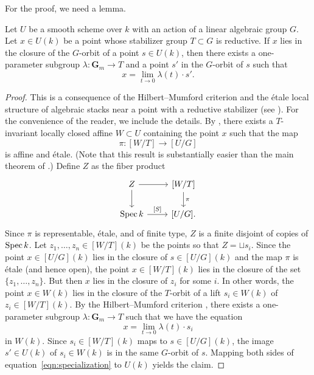 \documentclass[12pt,reqno]{amsart}
\renewcommand{\k}{k}
\renewcommand{\to}{{\longrightarrow}}
\numberwithin{equation}{section}
\newcommand{\G}{\mathbf G}
\begin{document}
For the proof, we need a lemma.
\begin{lemma}\label{prop:oneparam}
  Let \(U\) be a smooth scheme over $\k$ with an action of a linear algebraic group $G$.
  Let $x \in U(\k)$ be a point whose stabilizer group $T \subset G$ is reductive.
  If $x$ lies in the closure of the $G$-orbit of a point $s \in U(\k)$, then there exists a one-parameter subgroup $\lambda \colon \G_m \to T$ and a point $s'$ in the $G$-orbit of $s$ such that
  \[ x = \lim_{t \to 0} \lambda(t) \cdot s'.\]
\end{lemma}
\begin{proof}
  This is a consequence of the Hilbert--Mumford criterion and the \'etale local structure of algebraic stacks near a point with a reductive stabilizer (see \cite[\S~1.3 Immediate consequences (5)]{alp.hal.ryd:20}).
  For the convenience of the reader, we include the details.
  By \cite[Theorem~3]{alp:10}, there exists a $T$-invariant locally closed affine $W \subset U$ containing the point $x$ such that the map
  \[ \pi \colon [W/T] \to [U / G]\]
  is affine and \'etale.
  (Note that this result is substantially easier than the main theorem of \cite{alp.hal.ryd:20}.)
  Define $Z$ as the fiber product
  \[
    \begin{tikzcd}
      Z \ar{r}\ar{d}& {[W/T]}\ar{d}{\pi}\\
      \spec \k \ar{r}{[S]}& {[U/G]}.
    \end{tikzcd}
  \]
  Since $\pi$ is representable, \'etale, and of finite type, $Z$ is a finite disjoint of copies of $\spec \k$.
  Let $z_1, \dots, z_n \in [W/T](\k)$ be the points so that $Z = \sqcup s_i$.
  Since the point $x \in [U/G](\k)$ lies in the closure of $s \in [U/G](\k)$ and the map $\pi$ is \'etale (and hence open), the point $x \in [W/T](\k)$ lies in the closure of the set $\{z_1,\dots, z_n\}$.
  But then $x$ lies in the closure of $z_i$ for some $i$.
  In other words, the point $x \in W(\k)$ lies in the closure of the $T$-orbit of a lift $s_i \in W(\k)$ of $z_i \in [W/T](\k)$.
  By the Hilbert--Mumford criterion \cite[Theorem~1.4]{kem:78}, there exists a one-parameter subgroup $\lambda \colon \G_m \to T$ such that we have the equation
  \begin{equation}\label{eqn:specialization}
    x = \lim_{t \to 0} \lambda (t) \cdot s_i
  \end{equation}
  in $W(\k)$.
  Since $s_i \in [W/T](\k)$ maps to $s \in [U/G](\k)$, the image $s' \in U(\k)$ of $s_i \in W(\k)$ is in the same $G$-orbit of $s$.
  Mapping both sides of equation~\eqref{eqn:specialization} to $U(\k)$ yields the claim.
\end{proof}
\end{document}
